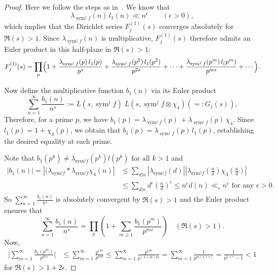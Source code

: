 \documentclass[10pt]{amsart}
\begin{document}
\begin{proof}
Here we follow the steps as in~\cite{SharmaSankaranarayanan2023}. We know that
\[
\lambda_{\operatorname{sym}^{j}f}(n)\,l_1(n) \ll n^{\epsilon} \qquad (\epsilon > 0),
\]
which implies that the Dirichlet series \(F_j^{(1)}(s)\) converges absolutely for \(\Re(s) > 1\). Since \(\lambda_{\operatorname{sym}^{j}f}(n)\) is multiplicative, \(F_j^{(1)}(s)\) therefore admits an Euler product in this half-plane in \(\Re(s) > 1\):
\begin{align} \label{eq:FjEuler1}
    F_{j}^{(1)}(s)=\prod_{p}
        \Bigl(1+
        \frac{\lambda_{\operatorname{sym}^{j}f}(p)\,l_1(p)}{p^{s}}+
        \frac{\lambda_{\operatorname{sym}^{j}f}(p^{2})\,l_1(p^{2})}{p^{2s}}+
        \cdots
        +\frac{\lambda_{\operatorname{sym}^{j}f}(p^{m})\,l_(p^{m})}{p^{ms}}+
        \cdots\Bigr).
\end{align}


Now define the multiplicative function \(b_1(n)\) via its Euler product
\[
\sum_{n=1}^{\infty}\frac{b_1(n)}{n^{s}} 
    := L(s,\operatorname{sym}^{j}f)\;L(s,\operatorname{sym}^{j}f\otimes\chi_4)
    (=: G_{j}(s)),
\]
Therefore, for a prime \(p\), we have $b_1(p) = \lambda_{\operatorname{sym}^{j}f}(p)\, 
       + \lambda_{\operatorname{sym}^{j}f}(p)\,\chi_4.$ Since \(l_1(p) = 1+\chi_4(p)\), we obtain that $b_1(p) = \lambda_{\operatorname{sym}^{j}f}(p)\,l_1(p)$, establishing the desired equality at each prime.

Note that $b_1(p^k) \neq \lambda_{\mathrm{sym}^jf}(p^k)l(p^k) \text{ for all } k>1$ and 
        \begin{align*}
            |b_1(n)| 
            =|(\lambda_{\mathrm{sym}^jf}*\lambda_{\mathrm{sym}^jf}\chi_{4}(n)|
            &\leq \sum_{d|n}|\lambda_{\mathrm{sym}^jf}(d)||\lambda_{\mathrm{sym}^jf}\left(\frac{n}{d}\right)\chi_{4}\left(\frac{n}{d}\right)| \\
            & \leq \sum_{d|n}d^{\epsilon}\left(\frac{n}{d}\right)^\epsilon \leq n^{\epsilon}d(n) \ll_\epsilon n^{\epsilon} \text{ for any } \epsilon >0.
        \end{align*}
        So $\displaystyle\sum_{n=1}^{\infty}\frac{b_1(n)}{n^s}$ is absolutely convergent by $\Re(s) > 1$ and the Euler product ensures that $$\sum_{n=1}^{\infty}\frac{b_1(n)}{n^s} = \prod_p \left(1+\sum_{m \geq1}\frac{b_1(p^m)}{p^{ms}}\right)\quad (\Re (s)>1).$$
        Now, \begin{align*}
            \bigg|\sum_{m=1}^{\infty}\frac{b_1(p^m)}{p^{ms}}\bigg| &\leq \sum_{m=1}^{\infty}\frac{p^{\epsilon m}}{p^{m\sigma}} \leq \sum_{m=1}^{\infty}\frac{p^{\epsilon m}}{p^{(1+2\epsilon)m}} = \sum_{m=1}^{\infty} \frac{1}{p^{m(1+\epsilon)}} = \frac{1}{p^{1+\epsilon}-1} <1 
        \end{align*}
        for $\Re(s) > 1+2\epsilon$.
        

\end{proof}
\end{document}
